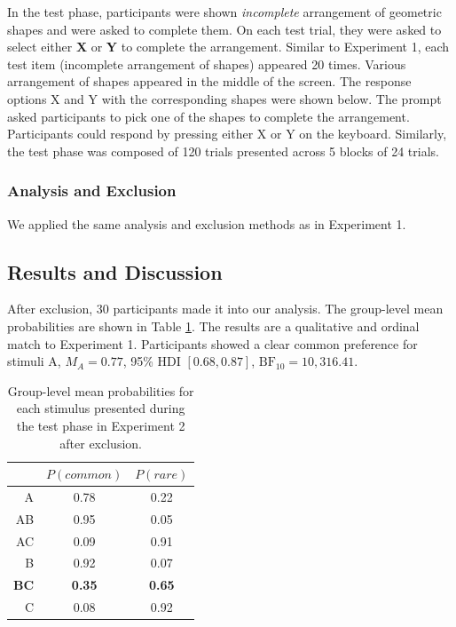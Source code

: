 \documentclass[10pt,letterpaper]{article}
\begin{document}
In the test phase, participants were shown \textit{incomplete} arrangement of geometric shapes and were asked to complete them.
On each test trial, they were asked to select either \textbf{X} or \textbf{Y} to complete the arrangement.
Similar to Experiment 1, each test item (incomplete arrangement of shapes) appeared 20 times.
Various arrangement of shapes appeared in the middle of the screen.
The response options X and Y with the corresponding shapes were shown below.
The prompt asked participants to pick one of the shapes to complete the arrangement.
Participants could respond by pressing either X or Y on the keyboard.
Similarly, the test phase was composed of 120 trials presented across 5 blocks of 24 trials.
\\

\subsubsection{Analysis and Exclusion}

We applied the same analysis and exclusion methods as in Experiment 1.

\subsection{Results and Discussion}

After exclusion, 30 participants made it into our analysis.
The group-level mean probabilities are shown in Table \ref{tab:results-exp2}.
The results are a qualitative and ordinal match to Experiment 1.
Participants showed a clear common preference for stimuli A, $M_{A} = 0.77$, 95\% HDI $[0.68, 0.87]$, $\mathrm{BF}_{10} = 10,316.41$.

\begin{table}[H]
  \begin{center}
    \caption{Group-level mean probabilities for each stimulus presented during the test phase in Experiment 2 after exclusion.\\}
    \label{tab:results-exp2}
    \vskip 0.12in
    \begin{tabular}{rcc}
      \hline
       & $P(common)$ & $P(rare)$ \\
      \hline
      A & 0.78 & 0.22  \\
      AB & 0.95 & 0.05 \\
      AC & 0.09 & 0.91 \\
      B & 0.92 & 0.07  \\
      \textbf{BC} & \textbf{0.35} & \textbf{0.65} \\
      C & 0.08 & 0.92 \\
    \end{tabular}
  \end{center}
\end{table}
\end{document}
